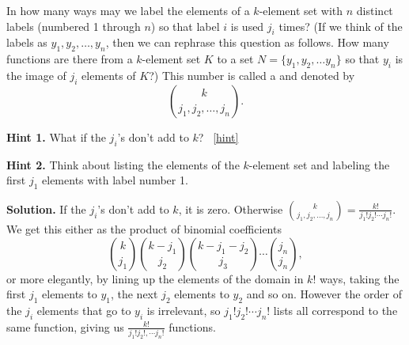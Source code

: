 \documentclass{book}
\begin{document}
\setcounter{project}{281}
\addtocounter{project}{-1}
\begin{activity}[]\label{activity-274}
\hypertarget{p-1443}{}%
In how many ways may we label the elements of a \(k\)-element set with \(n\) distinct labels (numbered 1 through \(n\)) so that label \(i\) is used \(j_i\) times? (If we think of the labels as \(y_1, y_2, \ldots, y_n\), then we can rephrase this question as follows.  How many functions are there from a \(k\)-element set \(K\) to a set \(N=\{y_1,y_2,\ldots y_n\}\) so that \(y_i\) is the image of \(j_i\) elements of \(K\)?) This number is called a  and denoted by%
\begin{equation*}
\binom{k}{j_1,j_2,\ldots, j_n}.
\end{equation*}
%
\par\smallskip%
\noindent\textbf{Hint 1.}\hypertarget{hint-182}{}\quad%
\hypertarget{p-1444}{}%
What if the \(j_i\)'s don't add to \(k\)?%
~\hfill{\tiny\hyperlink{a-281}{[hint]}\hypertarget{q-281}{}}\par\smallskip%
\noindent\textbf{Hint 2.}\hypertarget{hint-183}{}\quad%
\hypertarget{p-1445}{}%
Think about listing the elements of the \(k\)-element set and labeling the first \(j_1\) elements with label number 1.%
\par\smallskip%
\noindent\textbf{Solution.}\hypertarget{solution-184}{}\quad%
\hypertarget{p-1446}{}%
If the \(j_i\)'s don't add to \(k\), it is zero.  Otherwise \(\binom{k}{j_1,j_2,\ldots, j_n} =
\frac{k!}{j_1!j_2!\cdots j_n!}\). We get this either as the product of binomial coefficients%
\begin{equation*}
\binom{k}{j_1}\binom{k-j_1}{j_2}\binom{k-j_1-j_2}{j_3}\cdots\binom{j_n}{j_n},
\end{equation*}
or more elegantly, by lining up the elements of the domain in \(k!\) ways, taking the first \(j_1\) elements to \(y_1\), the next \(j_2\) elements to \(y_2\) and so on.  However the order of the \(j_i\) elements that go to \(y_i\) is irrelevant, so \(j_1!j_2!\cdots j_n!\) lists all correspond to the same function, giving us \(\frac{k!}{j_1!j_2!,\cdots j_n!}\) functions.%
\end{activity}

\clearpage
\end{document}
